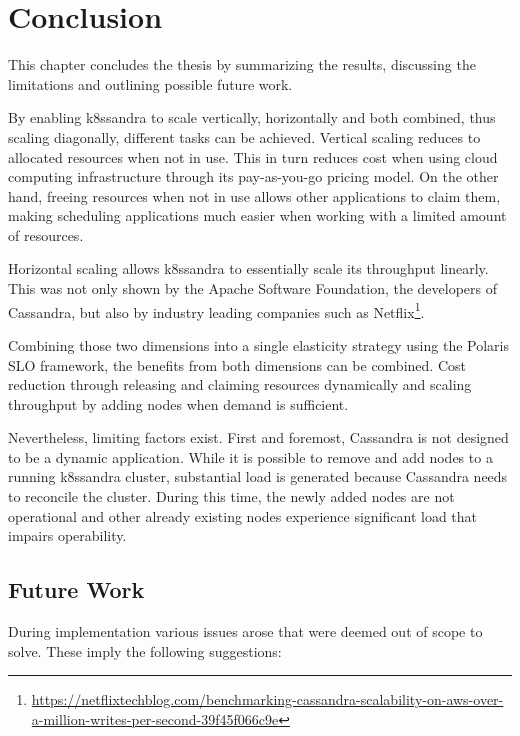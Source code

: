 \chapter{Conclusion}
\label{ch:conclusion}

This chapter concludes the thesis by summarizing the results, discussing the limitations and outlining possible future work.

By enabling k8ssandra to scale vertically, horizontally and both combined, thus scaling diagonally, different tasks can be achieved. Vertical scaling reduces to allocated resources when not in use. This in turn reduces cost when using cloud computing infrastructure through its pay-as-you-go pricing model. On the other hand, freeing resources when not in use allows other applications to claim them, making scheduling applications much easier when working with a limited amount of resources.

Horizontal scaling allows k8ssandra to essentially scale its throughput linearly. This was not only shown by the Apache Software Foundation, the developers of Cassandra, but also by industry leading companies such as Netflix\footnote{\raggedright\url{https://netflixtechblog.com/benchmarking-cassandra-scalability-on-aws-over-a-million-writes-per-second-39f45f066c9e}}.

Combining those two dimensions into a single elasticity strategy using the Polaris SLO framework, the benefits from both dimensions can be combined. Cost reduction through releasing and claiming resources dynamically and scaling throughput by adding nodes when demand is sufficient.

Nevertheless, limiting factors exist. First and foremost, Cassandra is not designed to be a dynamic application. While it is possible to remove and add nodes to a running k8ssandra cluster, substantial load is generated because Cassandra needs to reconcile the cluster. During this time, the newly added nodes are not operational and other already existing nodes experience significant load that impairs operability.

\section{Future Work}
\label{sec:future-work}

During implementation various issues arose that were deemed out of scope to solve. These imply the following suggestions:

